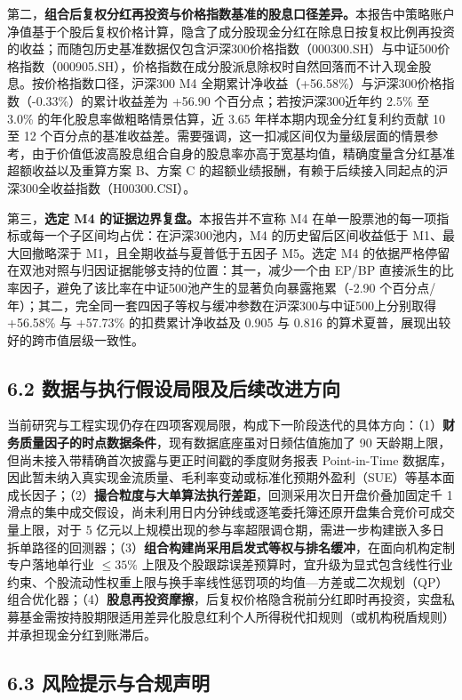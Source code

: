 \documentclass[12pt,a4paper]{article}
\let\origsubsection\subsection
\renewcommand{\subsection}[1]{\needspace{4\baselineskip}\origsubsection{#1}}
\begin{document}
第二，\textbf{组合后复权分红再投资与价格指数基准的股息口径差异。}本报告中策略账户净值基于个股后复权价格计算，隐含了成分股现金分红在除息日按复权比例再投资的收益；而随包历史基准数据仅包含沪深300价格指数（000300.SH）与中证500价格指数（000905.SH），价格指数在成分股派息除权时自然回落而不计入现金股息。按价格指数口径，沪深300 M4 全期累计净收益（+56.58\%）与沪深300价格指数（-0.33\%）的累计收益差为 +56.90 个百分点；若按沪深300近年约 2.5\% 至 3.0\% 的年化股息率做粗略情景估算，近 3.65 年样本期内现金分红复利约贡献 10 至 12 个百分点的基准收益差。需要强调，这一扣减区间仅为量级层面的情景参考，由于价值低波高股息组合自身的股息率亦高于宽基均值，精确度量含分红基准超额收益以及重算方案 B、方案 C 的超额业绩报酬，有赖于后续接入同起点的沪深300全收益指数（H00300.CSI）。

第三，\textbf{选定 M4 的证据边界复盘。}本报告并不宣称 M4 在单一股票池的每一项指标或每一个子区间均占优：在沪深300池内，M4 的历史留后区间收益低于 M1、最大回撤略深于 M1，且全期收益与夏普低于五因子 M5。选定 M4 的依据严格停留在双池对照与归因证据能够支持的位置：其一，减少一个由 EP/BP 直接派生的比率因子，避免了该比率在中证500池产生的显著负向暴露拖累（-2.90 个百分点/年）；其二，完全同一套四因子等权与缓冲参数在沪深300与中证500上分别取得 +56.58\% 与 +57.73\% 的扣费累计净收益及 0.905 与 0.816 的算术夏普，展现出较好的跨市值层级一致性。

\subsection{6.2 数据与执行假设局限及后续改进方向}

当前研究与工程实现仍存在四项客观局限，构成下一阶段迭代的具体方向：（1）\textbf{财务质量因子的时点数据条件}，现有数据底座虽对日频估值施加了 90 天龄期上限，但尚未接入带精确首次披露与更正时间戳的季度财务报表 Point-in-Time 数据库，因此暂未纳入真实现金流质量、毛利率变动或标准化预期外盈利（SUE）等基本面成长因子；（2）\textbf{撮合粒度与大单算法执行差距}，回测采用次日开盘价叠加固定千 1 滑点的集中成交假设，尚未利用日内分钟线或逐笔委托簿还原开盘集合竞价可成交量上限，对于 5 亿元以上规模出现的参与率超限调仓期，需进一步构建嵌入多日拆单路径的回测器；（3）\textbf{组合构建尚采用启发式等权与排名缓冲}，在面向机构定制专户落地单行业 $\le 35\%$ 上限及个股跟踪误差预算时，宜升级为显式包含线性行业约束、个股流动性权重上限与换手率线性惩罚项的均值—方差或二次规划（QP）组合优化器；（4）\textbf{股息再投资摩擦}，后复权价格隐含税前分红即时再投资，实盘私募基金需按持股期限适用差异化股息红利个人所得税代扣规则（或机构税盾规则）并承担现金分红到账滞后。

\subsection{6.3 风险提示与合规声明}
\end{document}

